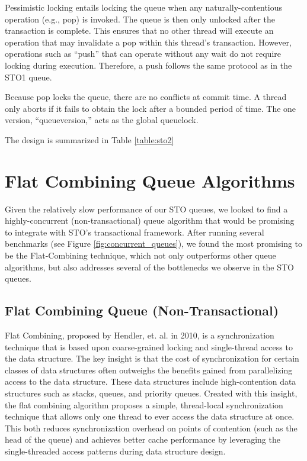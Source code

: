 Pessimistic locking entails locking the queue when any naturally-contentious operation (e.g., pop) is invoked. The queue is then only unlocked after the transaction is complete. This ensures that no other thread will execute an operation that may invalidate a pop within this thread's transaction. However, operations such as ``push'' that can operate without any wait do not require locking during execution. Therefore, a push follows the same protocol as in the STO1 queue.

Because pop locks the queue, there are no conflicts at commit time. A thread only aborts if it fails to obtain the lock after a bounded period of time. The one version, “queueversion,” acts as the global queuelock. 

The design is summarized in Table \ref{table:sto2}


\section{Flat Combining Queue Algorithms}
Given the relatively slow performance of our STO queues, we looked to find a highly-concurrent (non-transactional) queue algorithm that would be promising to integrate with STO's transactional framework. After running several benchmarks (see Figure \ref{fig:concurrent_queues}), we found the most promising to be the Flat-Combining technique, which not only outperforms other queue algorithms, but also addresses several of the bottlenecks we observe in the STO queues.

\subsection{Flat Combining Queue (Non-Transactional)}
\label{fcqueuent}


Flat Combining, proposed by Hendler, et. al. in 2010\cite{flatcombining}, is a synchronization technique that is based upon coarse-grained locking and single-thread access to the data structure. The key insight is that the cost of synchronization for certain classes of data structures often outweighs the benefits gained from parallelizing access to the data structure. These data structures include high-contention data structures such as stacks, queues, and priority queues. Created with this insight, the flat combining algorithm proposes a simple, thread-local synchronization technique that allows only one thread to ever access the data structure at once. This both reduces synchronization overhead on points of contention (such as the head of the queue) and achieves better cache performance by leveraging the single-threaded access patterns during data structure design.

